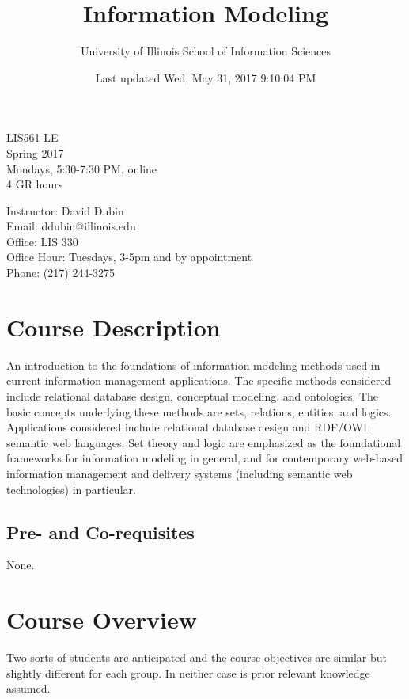 \documentclass[]{article}
\title{Information Modeling}
\author{University of Illinois School of Information Sciences}
\date{Last updated Wed, May 31, 2017 9:10:04 PM}
\begin{document}
\maketitle

LIS561-LE\\
Spring 2017\\
Mondays, 5:30-7:30 PM, online\\
4 GR hours

Instructor: David Dubin\\
Email: ddubin@illinois.edu\\
Office: LIS 330\\
Office Hour: Tuesdays, 3-5pm and by appointment\\
Phone: (217) 244-3275

\section{Course Description}\label{course-description}

An introduction to the foundations of information modeling methods used
in current information management applications. The specific methods
considered include relational database design, conceptual modeling, and
ontologies. The basic concepts underlying these methods are sets,
relations, entities, and logics. Applications considered include
relational database design and RDF/OWL semantic web languages. Set
theory and logic are emphasized as the foundational frameworks for
information modeling in general, and for contemporary web-based
information management and delivery systems (including semantic web
technologies) in particular.

\subsection{Pre- and Co-requisites}\label{pre--and-co-requisites}

None.

\section{Course Overview}\label{course-overview}

Two sorts of students are anticipated and the course objectives are
similar but slightly different for each group. In neither case is prior
relevant knowledge assumed.
\end{document}
